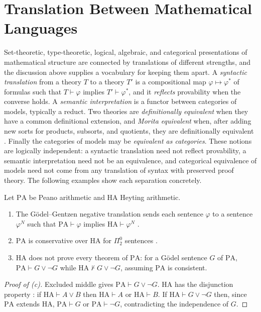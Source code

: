 \section{Translation Between Mathematical Languages}

Set-theoretic, type-theoretic, logical, algebraic, and categorical presentations of mathematical structure are connected by translations of different strengths, and the discussion above supplies a vocabulary for keeping them apart. A \emph{syntactic translation} from a theory $T$ to a theory $T'$ is a compositional map $\varphi\mapsto\varphi^{\ast}$ of formulas such that $T\vdash\varphi$ implies $T'\vdash\varphi^{\ast}$, and it \emph{reflects} provability when the converse holds. A \emph{semantic interpretation} is a functor between categories of models, typically a reduct. Two theories are \emph{definitionally equivalent} when they have a common definitional extension, and \emph{Morita equivalent} when, after adding new sorts for products, subsorts, and quotients, they are definitionally equivalent \cite{barretthalvorson}. Finally the categories of models may be \emph{equivalent as categories}. These notions are logically independent: a syntactic translation need not reflect provability, a semantic interpretation need not be an equivalence, and categorical equivalence of models need not come from any translation of syntax with preserved proof theory. The following examples show each separation concretely.

\begin{proposition}\label{prop:PAHA}
Let $\mathrm{PA}$ be Peano arithmetic and $\mathrm{HA}$ Heyting arithmetic.
\begin{enumerate}[label=(\alph*)]
\item The G\"odel--Gentzen negative translation sends each sentence $\varphi$ to a sentence $\varphi^N$ such that $\mathrm{PA}\vdash\varphi$ implies $\mathrm{HA}\vdash\varphi^N$ \cite{troelstravandalen}.
\item $\mathrm{PA}$ is conservative over $\mathrm{HA}$ for $\Pi^0_2$ sentences \cite{friedman}.
\item $\mathrm{HA}$ does not prove every theorem of $\mathrm{PA}$: for a G\"odel sentence $G$ of $\mathrm{PA}$, $\mathrm{PA}\vdash G\vee\neg G$ while $\mathrm{HA}\nvdash G\vee\neg G$, assuming $\mathrm{PA}$ is consistent.
\end{enumerate}
\end{proposition}
\begin{proof}[Proof of (c)]
Excluded middle gives $\mathrm{PA}\vdash G\vee\neg G$. $\mathrm{HA}$ has the disjunction property \cite{troelstravandalen}: if $\mathrm{HA}\vdash A\vee B$ then $\mathrm{HA}\vdash A$ or $\mathrm{HA}\vdash B$. If $\mathrm{HA}\vdash G\vee\neg G$ then, since $\mathrm{PA}$ extends $\mathrm{HA}$, $\mathrm{PA}\vdash G$ or $\mathrm{PA}\vdash\neg G$, contradicting the independence of $G$.
\end{proof}

